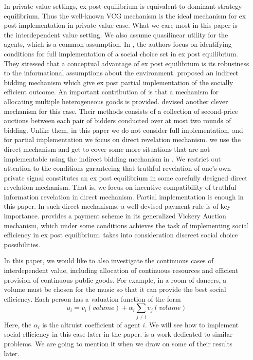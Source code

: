  In private value settings, ex post equilibrium is equivalent to dominant strategy
 equilibrium. Thus the well-known VCG mechanism is the ideal mechanism for ex post implementation in private value case. What we care
 most in this paper is the interdependent value setting. We also assume quasilinear utility for the agents, which is a common 
 assumption. 
In \parencite{BergemannM08}, the authors focus on identifying conditions for full implementation
 of a social choice set in ex post equilibrium. They stressed that a conceptual advantage of ex post equilibrium is its 
 robustness to the informational assumptions about the environment. \parencite{Maskin00} proposed an indirect bidding mechanism which
 give ex post partial implementation of the socially efficient outcome.
   An important contribution of \parencite{Maskin00} is that a mechanism for allocating  multiple heterogeneous goods is 
 provided. \parencite{Perry2002} devised another clever mechanism for this case. Their methods consists of a collection of second-price 
 auctions between each pair of bidders conducted over at most two rounds of bidding. Unlike them, in this paper we do not consider 
 full implementation, and for partial implementation we focus on direct revelation mechanism. we use the direct mechanism and get 
 to cover some more situations that are not implementable using the indirect bidding mechanism in \parencite{Maskin00}.
 We restrict out attention to the conditions garanteeing that truthful revelation of one's own private signal constitutes an ex post 
 equilibrium in some carefully designed direct revelation mechanism. That is, we focus on incentive compatibility of truthful
 information revelation in direct mechanism. Partial implementation is enough in this paper. In such direct mechanisms,
 a well devised payment rule is of key importance. \parencite{Ausubel99} provides a payment scheme in its generalized Vickery Auction
 mechanism, which under some conditions achieves the task of implementing social efficiency in ex post equilibrium. 
 \parencite{Jehiel2001} takes into consideration discreet social choice possibilities. 
 
 In this paper, we would like to also investigate the continuous
 cases of interdependent value,  including allocation of continuous resources and efficient provision of continuous public goods. 
 For example, in a room of dancers, a volume must be chosen for the music so that it can provide the best social efficiency. Each person
 has a valuation function of the form 
 $$u_i= v_i(volume) + \alpha_i\sum_{j\neq i}v_j(volume)$$
 Here, the $\alpha_i$ is the altruist coefficient of agent $i$. We will see how to implement social efficiency in this case later in
 the paper. \parencite{Ely2006} is a work dedicated to similar problems. We are going to mention it when we draw on some of their results
 later.


